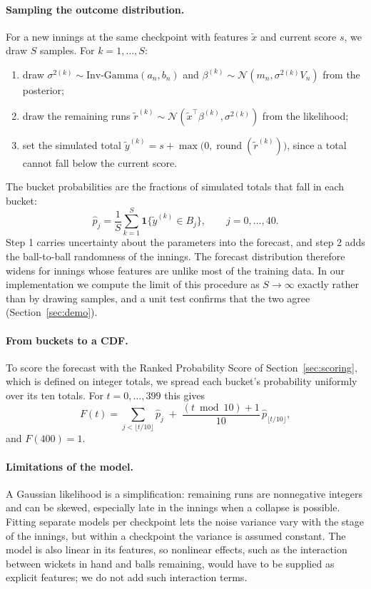 \documentclass{article}
\newcommand{\1}{\mathbf{1}}
\begin{document}
\paragraph{Sampling the outcome distribution.} For a new innings at the same checkpoint with features $\tilde x$ and current score $s$, we draw $S$ samples. For $k = 1, \dots, S$:
\begin{enumerate}
\item draw $\sigma^{2(k)} \sim \text{Inv-Gamma}(a_n, b_n)$ and $\beta^{(k)} \sim \mathcal{N}(m_n, \sigma^{2(k)} V_n)$ from the posterior;
\item draw the remaining runs $\tilde r^{(k)} \sim \mathcal{N}(\tilde x^\top \beta^{(k)}, \sigma^{2(k)})$ from the likelihood;
\item set the simulated total $\tilde y^{(k)} = s + \max\big(0, \operatorname{round}(\tilde r^{(k)})\big)$, since a total cannot fall below the current score.
\end{enumerate}
The bucket probabilities are the fractions of simulated totals that fall in each bucket:
\begin{equation}
\hat p_j = \frac{1}{S} \sum_{k=1}^{S} \1\{\tilde y^{(k)} \in B_j\}, \qquad j = 0, \dots, 40.
\end{equation}
Step 1 carries uncertainty about the parameters into the forecast, and step 2 adds the ball-to-ball randomness of the innings. The forecast distribution therefore widens for innings whose features are unlike most of the training data. In our implementation we compute the limit of this procedure as $S \to \infty$ exactly rather than by drawing samples, and a unit test confirms that the two agree (Section~\ref{sec:demo}).

\paragraph{From buckets to a CDF.} To score the forecast with the Ranked Probability Score of Section~\ref{sec:scoring}, which is defined on integer totals, we spread each bucket's probability uniformly over its ten totals. For $t = 0, \dots, 399$ this gives
\begin{equation}\label{eq:bucketcdf}
F(t) = \sum_{j < \lfloor t/10 \rfloor} \hat p_j \;+\; \frac{(t \bmod 10) + 1}{10}\, \hat p_{\lfloor t/10 \rfloor},
\end{equation}
and $F(400) = 1$.

\paragraph{Limitations of the model.} A Gaussian likelihood is a simplification: remaining runs are nonnegative integers and can be skewed, especially late in the innings when a collapse is possible. Fitting separate models per checkpoint lets the noise variance vary with the stage of the innings, but within a checkpoint the variance is assumed constant. The model is also linear in its features, so nonlinear effects, such as the interaction between wickets in hand and balls remaining, would have to be supplied as explicit features; we do not add such interaction terms.
\end{document}
